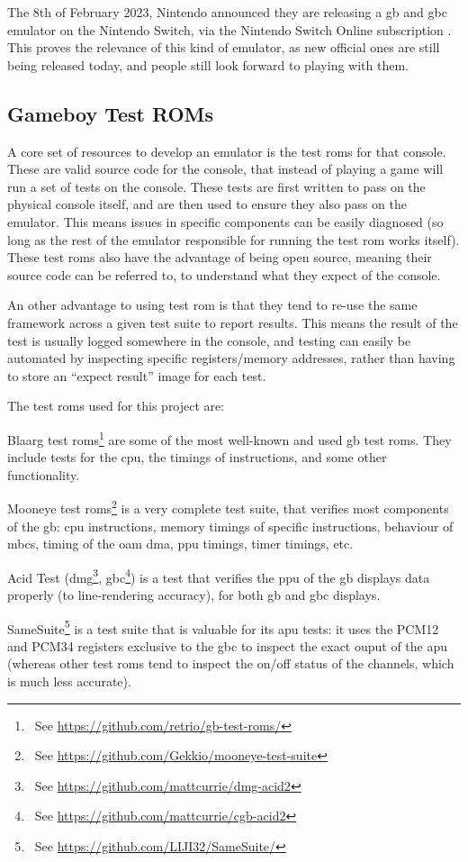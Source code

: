\documentclass[11pt]{informatics-report}
\newcommand{\ftnt}[1]{\footnote{~See \url{#1}}}
\begin{document}
The 8th of February 2023, Nintendo announced they are releasing a \glsdesc{gb} and \glsdesc{gbc} emulator on the Nintendo Switch, via the Nintendo Switch Online subscription \cite{switch_gb_emu}. This proves the relevance of this kind of emulator, as new official ones are still being released today, and people still look forward to playing with them.

\subsection{Gameboy Test ROMs}
\label{sec:gb-test-roms}

A core set of resources to develop an emulator is the test \glspl{rom} for that console. These are valid source code for the console, that instead of playing a game will run a set of tests on the console. These tests are first written to pass on the physical console itself, and are then used to ensure they also pass on the emulator. This means issues in specific components can be easily diagnosed (so long as the rest of the emulator responsible for running the test \gls{rom} works itself). These test \glspl{rom} also have the advantage of being open source, meaning their source code can be referred to, to understand what they expect of the console.

An other advantage to using test \gls{rom} is that they tend to re-use the same framework across a given test suite to report results. This means the result of the test is usually logged somewhere in the console, and testing can easily be automated by inspecting specific registers/memory addresses, rather than having to store an ``expect result'' image for each test.

The test \glspl{rom} used for this project are:

\begin{compactitem}
    \item Blaarg test \glspl{rom}\ftnt{https://github.com/retrio/gb-test-roms/} are some of the most well-known and used \gls{gb} test \glspl{rom}. They include tests for the \gls{cpu}, the timings of instructions, and some other functionality.
    \item Mooneye test \glspl{rom}\ftnt{https://github.com/Gekkio/mooneye-test-suite} is a very complete test suite, that verifies most components of the \gls{gb}: \gls{cpu} instructions, memory timings of specific instructions, behaviour of \glspl{mbc}, timing of the \gls{oam} \gls{dma}, \gls{ppu} timings, timer timings, etc.
    \item Acid Test (\gls{dmg}\ftnt{https://github.com/mattcurrie/dmg-acid2}, \gls{gbc}\ftnt{https://github.com/mattcurrie/cgb-acid2}) is a test that verifies the \gls{ppu} of the \gls{gb} displays data properly (to line-rendering accuracy), for both \glsdesc{gb} and \glsdesc{gbc} displays.
    \item SameSuite\ftnt{https://github.com/LIJI32/SameSuite/} is a test suite that is valuable for its \gls{apu} tests: it uses the PCM12 and PCM34 registers exclusive to the \gls{gbc} to inspect the exact ouput of the \gls{apu} (whereas other test \glspl{rom} tend to inspect the on/off status of the channels, which is much less accurate).
\end{compactitem}
\end{document}
